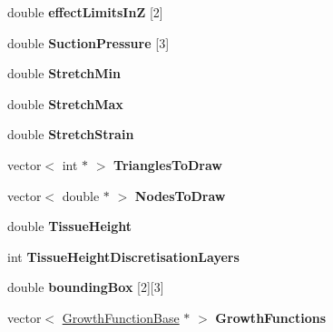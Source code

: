 \begin{DoxyCompactItemize}
\item 
\hypertarget{classSimulation_a70a94dce9bdc0a99a99cab0abe805185}{}double {\bfseries effect\+Limits\+In\+Z} \mbox{[}2\mbox{]}\label{classSimulation_a70a94dce9bdc0a99a99cab0abe805185}

\item 
\hypertarget{classSimulation_aa7b121f145af33dae88b463490aef709}{}double {\bfseries Suction\+Pressure} \mbox{[}3\mbox{]}\label{classSimulation_aa7b121f145af33dae88b463490aef709}

\item 
\hypertarget{classSimulation_a579d17e790d3ea2e470db00e3a732e0c}{}double {\bfseries Stretch\+Min}\label{classSimulation_a579d17e790d3ea2e470db00e3a732e0c}

\item 
\hypertarget{classSimulation_a53227db1a41449ba235979fdd052f42e}{}double {\bfseries Stretch\+Max}\label{classSimulation_a53227db1a41449ba235979fdd052f42e}

\item 
\hypertarget{classSimulation_a76aca0fc8a6de8550af15556d18e6dfb}{}double {\bfseries Stretch\+Strain}\label{classSimulation_a76aca0fc8a6de8550af15556d18e6dfb}

\item 
\hypertarget{classSimulation_aaffbf9ee13e071aa1cdc8e75a0d79774}{}vector$<$ int $\ast$ $>$ {\bfseries Triangles\+To\+Draw}\label{classSimulation_aaffbf9ee13e071aa1cdc8e75a0d79774}

\item 
\hypertarget{classSimulation_aa08434e5c71b265f87aab46be36438be}{}vector$<$ double $\ast$ $>$ {\bfseries Nodes\+To\+Draw}\label{classSimulation_aa08434e5c71b265f87aab46be36438be}

\item 
\hypertarget{classSimulation_adad1e5ce0657d347c8b46a4d1749caa3}{}double {\bfseries Tissue\+Height}\label{classSimulation_adad1e5ce0657d347c8b46a4d1749caa3}

\item 
\hypertarget{classSimulation_aafb36172155cdd675fb7d8cbe057c0ab}{}int {\bfseries Tissue\+Height\+Discretisation\+Layers}\label{classSimulation_aafb36172155cdd675fb7d8cbe057c0ab}

\item 
\hypertarget{classSimulation_a8e5b5de0190d35c7984c4b393fd9fcd9}{}double {\bfseries bounding\+Box} \mbox{[}2\mbox{]}\mbox{[}3\mbox{]}\label{classSimulation_a8e5b5de0190d35c7984c4b393fd9fcd9}

\item 
\hypertarget{classSimulation_a88e857983b0152e32b969dfd3ed72fdc}{}vector$<$ \hyperlink{classGrowthFunctionBase}{Growth\+Function\+Base} $\ast$ $>$ {\bfseries Growth\+Functions}\label{classSimulation_a88e857983b0152e32b969dfd3ed72fdc}

\end{DoxyCompactItemize}


